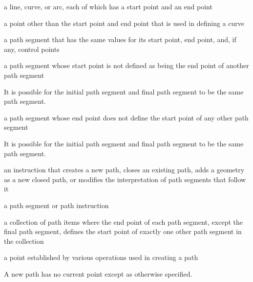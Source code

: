 
%
a line, \bezierlocal curve, or arc, each of which has a start point and an end point

%
a point other than the start point and end point that is used in defining a \bezierlocal curve

%
a path segment that has the same values for its start point, end point, and, if any, control points

%
a path segment whose start point is not defined as being the end point of another path segment
\begin{note}
It is possible for the initial path segment and final path segment to be the same path segment.
\end{note}

%
a path segment whose end point does not define the start point of any other path segment
\begin{note}
It is possible for the initial path segment and final path segment to be the same path segment.
\end{note}

%
an instruction that creates a new path, closes an existing path, adds a geometry as a new closed path, or modifies the interpretation of path segments that follow it

%
a path segment or path instruction

%
a collection of path items where the end point of each path segment, except the final path segment, defines the start point of exactly one other path segment in the collection

%
a point established by various operations used in creating a path
\begin{note}
A new path has no current point except as otherwise specified.
\end{note}


